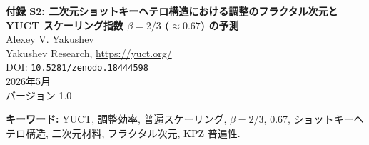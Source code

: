 \documentclass[12pt,a4paper]{article}
\theoremstyle{remark}
\begin{document}
	
	\begin{titlepage}
		\centering
		\vspace*{1cm}
		{\Huge\bfseries 付録 S2: 二次元ショットキーヘテロ構造における調整のフラクタル次元と \\ YUCT スケーリング指数 $\beta = 2/3$ ($\approx 0.67$) の予測}\\[1cm]
		{\large Alexey V. Yakushev}\\[0.3cm]
		{\normalsize Yakushev Research, \url{https://yuct.org/}}\\[1.5cm]
		{\normalsize DOI: \texttt{10.5281/zenodo.18444598}}\\[0.5cm]
		{\normalsize 2026年5月\\バージョン 1.0}\\[2cm]
		
		\begin{minipage}{0.9\textwidth}
			\begin{abstract}
				\noindent
				Ang, Yang \& Ang (Phys. Rev. Lett. 121, 056802, 2018) は、
				二次元ショットキーヘテロ構造において普遍的な電流-温度スケーリング則
				$\log(\mathcal{I}/T^{3/2}) \propto -1/T$（横方向コンタクト）および
				$\log(\mathcal{I}/T^{1}) \propto -1/T$（運動量非保存の縦方向コンタクト）
				を発見した。本付録では、両指数が輸送を制御する調整ネットワークの
				実効フラクタル次元 $d_f$ によって支配されることを示す。
				YUCT 普遍誤差スケーリング則 $\varepsilon = \kappa_c\alpha
				K_{\mathrm{eff}}^{-\beta}$（$\beta = 2/3 \approx 0.67$）は
				$\beta = 2/d_f$ を介して $d_f$ と結びつく。実験的な電流スケーリングから、
				横方向コンタクトでは $d_f = 3$、縦方向コンタクトでは $d_f = 2$ を抽出し、
				それぞれ $\beta = 2/3$ および $\beta = 1$ を与える。この分析は、
				横方向ショットキーダイオードにおける相対電流変動が
				$\varepsilon_{\mathrm{fluc}} \propto K_{\mathrm{eff}}^{-2/3}$ に従うと予測する。
				これは標準的なノイズ分光法で検証可能な反証可能な予測である。
				本付録は、二次元ショットキーヘテロ構造を、普遍的な YUCT 指数
				$\beta = 2/3$ ($0.67$) を示すかまたは示すと予測される系のファミリーに
				組み込み、理論の到達範囲を固体ナノエレクトロニクスに拡張する。
			\end{abstract}
			\vspace{1cm}
			\noindent\small\textbf{キーワード:} YUCT, 調整効率, 普遍スケーリング,
			$\beta = 2/3$, 0.67, ショットキーヘテロ構造, 二次元材料,
			フラクタル次元, KPZ 普遍性.
		\end{minipage}
	\end{titlepage}
	
	\tableofcontents
	\newpage
	
\end{document}
